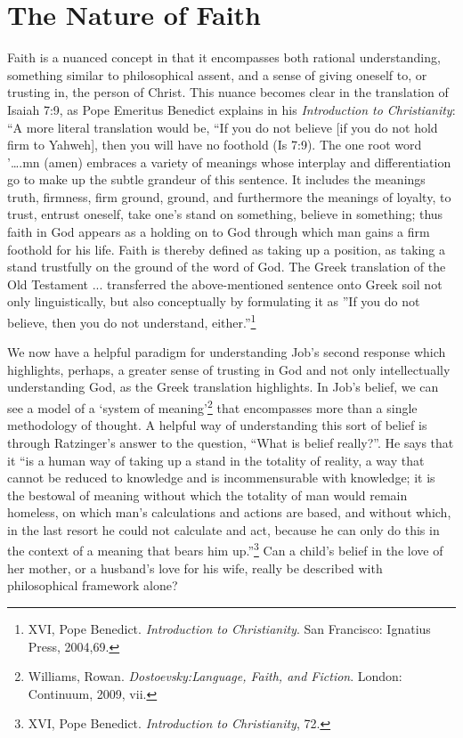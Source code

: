 \section{The Nature of Faith}
Faith is a nuanced concept in that it encompasses both rational understanding, something similar to philosophical assent, and a sense of giving oneself to, or trusting in, the person of Christ. This nuance becomes clear in the translation of Isaiah 7:9, as Pope Emeritus Benedict explains in his \emph{Introduction to Christianity}: ``A more literal translation would be, ``If you do not believe [if you do not hold firm to Yahweh], then you will have no foothold (Is 7:9). The one root word '….mn (amen) embraces a variety of meanings whose interplay and differentiation go to make up the subtle grandeur of this sentence. It includes the meanings truth, firmness, firm ground, ground, and furthermore the meanings of loyalty, to trust, entrust oneself, take one's stand on something, believe in something; thus faith in God appears as a holding on to God through which man gains a firm foothold for his life. Faith is thereby defined as taking up a position, as taking a stand trustfully on the ground of the word of God. The Greek translation of the Old Testament ... transferred the above-mentioned sentence onto Greek soil not only linguistically, but also conceptually by formulating it as ''If you do not believe, then you do not understand, either.''\footnote{XVI, Pope Benedict. \emph{Introduction to Christianity}. San Francisco: Ignatius Press, 2004,69.}

We now have a helpful paradigm for understanding Job's second response which highlights, perhaps, a greater sense of trusting in God and not only intellectually understanding God, as the Greek translation highlights. In Job's belief, we can see a model of a `system of meaning'\footnote{Williams, Rowan. \emph{Dostoevsky:Language, Faith, and Fiction}. London: Continuum, 2009, vii.} that encompasses more than a single methodology of thought. A helpful way of understanding this sort of belief is through Ratzinger's answer to the question, ``What is belief really?''. He says that it ``is a human way of taking up a stand in the totality of reality, a way that cannot be reduced to knowledge and is incommensurable with knowledge; it is the bestowal of meaning without which the totality of man would remain homeless, on which man's calculations and actions are based, and without which, in the last resort he could not calculate and act, because he can only do this in the context of a meaning that bears him up.''\footnote{XVI, Pope Benedict. \emph{Introduction to Christianity}, 72.} Can a child's belief in the love of her mother, or a husband's love for his wife, really be described with philosophical framework alone?


